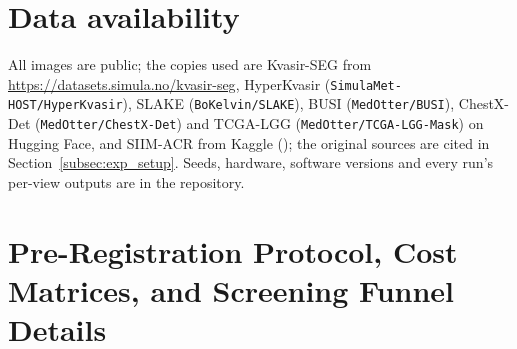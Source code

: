 \documentclass[5p,times,twocolumn,authoryear]{elsarticle}
\begin{document}
\section*{Data availability}
All images are public; the copies used are Kvasir-SEG from \url{https://datasets.simula.no/kvasir-seg}, HyperKvasir (\texttt{SimulaMet-HOST/HyperKvasir}), SLAKE (\texttt{BoKelvin/SLAKE}), BUSI (\texttt{MedOtter/BUSI}), ChestX-Det (\texttt{MedOtter/ChestX-Det}) and TCGA-LGG (\texttt{MedOtter/TCGA-LGG-Mask}) on Hugging Face, and SIIM-ACR from Kaggle (); the original sources are cited in Section~\ref{subsec:exp_setup}. Seeds, hardware, software versions and every run's per-view outputs are in the repository.




\newpage
\onecolumn
\appendix

\section{Pre-Registration Protocol, Cost Matrices, and Screening Funnel Details}
\label{app:prereg_and_funnel}
\end{document}
